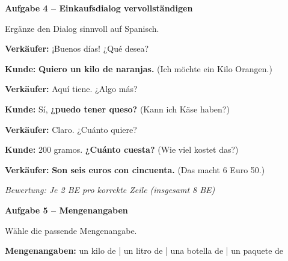 \documentclass[11pt, a4paper]{article}
\newcommand{\fachfarbe}{spanisch}
\newcommand{\punktebox}[1]{\hfill\fbox{\small \_/#1}}
\newcommand{\lsg}[1]{\textcolor{loesung}{\textbf{#1}}}
\newenvironment{aufgabe}[1]{%
    \needspace{5\baselineskip}%
    \nopagebreak[4]%
    \vspace{10pt}
    \noindent\textbf{\textcolor{\fachfarbe}{Aufgabe #1}}
    \nopagebreak[4]%
    \vspace{5pt}
    \nopagebreak[4]%
    \begin{list}{}{\leftmargin=0pt}
    \item[]
}{%
    \end{list}
}
\begin{document}
\begin{aufgabe}{4 -- Einkaufsdialog vervollständigen}
Ergänze den Dialog sinnvoll auf Spanisch. \punktebox{8}
\end{aufgabe}

\noindent
\textbf{Verkäufer:} ¡Buenos días! ¿Qué desea?

\vspace{0.8em}

\noindent
\textbf{Kunde:} \lsg{Quiero un kilo de naranjas.} \hfill (Ich möchte ein Kilo Orangen.)

\vspace{0.8em}

\noindent
\textbf{Verkäufer:} Aquí tiene. ¿Algo más?

\vspace{0.8em}

\noindent
\textbf{Kunde:} Sí, \lsg{¿puedo tener queso?} \hfill (Kann ich Käse haben?)

\vspace{0.8em}

\noindent
\textbf{Verkäufer:} Claro. ¿Cuánto quiere?

\vspace{0.8em}

\noindent
\textbf{Kunde:} 200 gramos. \lsg{¿Cuánto cuesta?} \hfill (Wie viel kostet das?)

\vspace{0.8em}

\noindent
\textbf{Verkäufer:} \lsg{Son seis euros con cincuenta.} \hfill (Das macht 6 Euro 50.)

\vspace{0.5em}

\textit{Bewertung: Je 2 BE pro korrekte Zeile (insgesamt 8 BE)}

\vspace{15pt}


\begin{aufgabe}{5 -- Mengenangaben}
Wähle die passende Mengenangabe. \punktebox{4}
\end{aufgabe}

\begin{hinweis}
\textbf{Mengenangaben:} un kilo de | un litro de | una botella de | un paquete de
\end{hinweis}

\vspace{0.5em}
\end{document}
